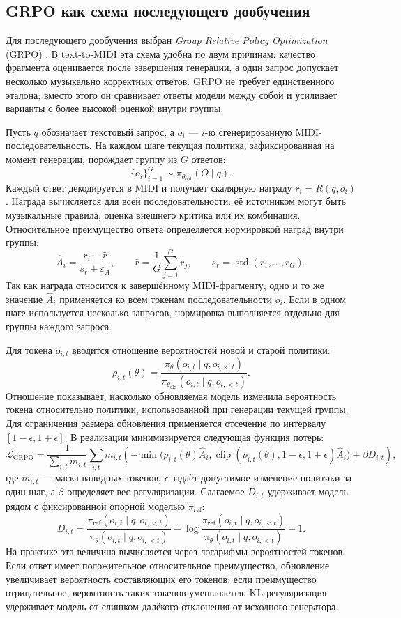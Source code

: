 \documentclass[a4paper,12pt]{extarticle}
\begin{document}
\subsection{GRPO как схема последующего дообучения}

Для последующего дообучения выбран \textit{Group Relative Policy
Optimization} (GRPO) \cite{deepseekmath2024}. В text-to-MIDI эта схема
удобна по двум причинам: качество фрагмента оценивается после завершения
генерации, а один запрос допускает несколько музыкально корректных ответов.
GRPO не требует единственного эталона; вместо этого он сравнивает ответы
модели между собой и усиливает варианты с более высокой оценкой внутри
группы.

Пусть $q$ обозначает текстовый запрос, а $o_i$ --- $i$-ю
сгенерированную MIDI-последовательность. На каждом шаге текущая политика,
зафиксированная на момент генерации, порождает группу из $G$ ответов:
\[
\{o_i\}_{i=1}^G \sim \pi_{\theta_{\mathrm{old}}}(O \mid q).
\]
Каждый ответ декодируется в MIDI и получает скалярную награду
$r_i = R(q,o_i)$. Награда вычисляется для всей последовательности:
её источником могут быть музыкальные правила, оценка внешнего критика
или их комбинация. Относительное преимущество ответа определяется
нормировкой наград внутри группы:
\[
\hat{A}_{i} =
\frac{r_i - \bar r}
{s_r+\varepsilon_A},
\qquad
\bar r = \frac{1}{G}\sum_{j=1}^{G} r_j,
\qquad
s_r = \operatorname{std}(r_1,\ldots,r_G).
\]
Так как награда относится к завершённому MIDI-фрагменту, одно и то же
значение $\hat{A}_{i}$ применяется ко всем токенам последовательности
$o_i$. Если в одном шаге используется несколько запросов, нормировка
выполняется отдельно для группы каждого запроса.

Для токена $o_{i,t}$ вводится отношение вероятностей новой и старой
политики:
\[
\rho_{i,t}(\theta)=
\frac{\pi_\theta(o_{i,t}\mid q,o_{i,<t})}
{\pi_{\theta_{\mathrm{old}}}(o_{i,t}\mid q,o_{i,<t})}.
\]
Отношение показывает, насколько обновляемая модель изменила
вероятность токена относительно политики, использованной при генерации
текущей группы. Для ограничения размера обновления применяется отсечение
по интервалу $[1-\epsilon,1+\epsilon]$. В реализации минимизируется
следующая функция потерь:
\[
\mathcal{L}_{\mathrm{GRPO}} =
\frac{1}{\sum_{i,t} m_{i,t}}
\sum_{i,t} m_{i,t}
\left(
-\min\big(
\rho_{i,t}(\theta)\hat{A}_{i},
\operatorname{clip}(\rho_{i,t}(\theta),1-\epsilon,1+\epsilon)\hat{A}_{i}
\big)
+\beta D_{i,t}
\right),
\]
где $m_{i,t}$ --- маска валидных токенов, $\epsilon$ задаёт допустимое
изменение политики за один шаг, а $\beta$ определяет вес регуляризации.
Слагаемое $D_{i,t}$ удерживает модель рядом с фиксированной опорной
моделью $\pi_{\mathrm{ref}}$:
\[
D_{i,t} =
\frac{\pi_{\mathrm{ref}}(o_{i,t}\mid q,o_{i,<t})}
{\pi_\theta(o_{i,t}\mid q,o_{i,<t})}
-
\log
\frac{\pi_{\mathrm{ref}}(o_{i,t}\mid q,o_{i,<t})}
{\pi_\theta(o_{i,t}\mid q,o_{i,<t})}
-1.
\]
На практике эта величина вычисляется через логарифмы вероятностей токенов.
Если ответ имеет положительное относительное преимущество, обновление
увеличивает вероятность составляющих его токенов; если преимущество
отрицательное, вероятность таких токенов уменьшается. KL-регуляризация
удерживает модель от слишком далёкого отклонения от
исходного генератора.
\end{document}
